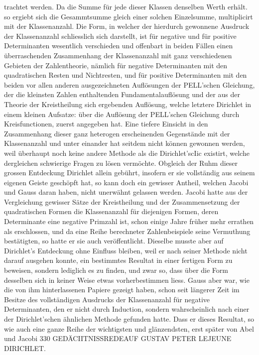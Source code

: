 \documentclass[11pt]{article}
\begin{document}
\noindent trachtet werden. Da die Summe für jede dieser Klassen denselben Werth erhält. so ergiebt sich die Gesammtsumme gleich einer solchen Einzelsumme, multiplicirt mit der Klassenanzahl. Die Form, in welcher der hierdurch gewonnene Ausdruck der Klassenanzahl schliesslich sich darstellt, ist für negative und für positive Determinanten wesentlich verschieden und offenbart in beiden Fällen einen überraschenden Zusammenhang der Klassenanzahl mit ganz verschiedenen Gebieten der Zahlentheorie, nämlich für negative Determinanten mit den quadratischen Resten und Nichtresten, und für positive Determinanten mit den beiden vor allen anderen ausgezeichneten Auflösungen der PELL’schen Gleichung, der die kleinsten Zahlen enthaltenden Fundamentalauflösung und der aus der Theorie der Kreistheilung sich ergebenden Auflösung, welche letztere Dirichlet in einem kleinen Aufsatze: über die Auflösung der PELL’schen Gleichung durch Kreisfunctionen, zuerst angegeben hat. Eine tiefere Einsicht in den Zusammenhang dieser ganz heterogen erscheinenden Gegenstände mit der Klassenanzahl und unter einander hat seitdem nicht können gewonnen werden, weil überhaupt noch keine andere Methode als die Dirichlet’scIic existirt, welche dergleichen schwierige Fragen zu lösen vermöchte. Obgleich der Ruhm dieser grossen Entdeckung Dirichlet allein gebührt, insofern er sie vollständig aus seinem eigenen Geiste geschöpft hat, so kann doch ein gewisser Antheil, welchen Jacobi und Gauss daran haben, nicht unerwähnt gelassen werden. Jacobi hatte aus der Vergleichung gewisser Sätze der Kreistheilung und der Zusammensetzung der quadratischen Formen die Klassenanzahl für diejenigen Formen, deren Determinante eine negative Primzahl ist, schon einige Jahre früher mehr errathen als erschlossen, und da eine Reihe berechneter Zahlenbeispiele seine Vermuthung bestätigten, so hatte er sie auch veröffentlicht. Dieselbe musste aber auf Dirichlet’s Entdeckung ohne Einfluss bleiben, weil er nach seiner Methode nicht darauf ausgehen konnte, ein bestimmtes Resultat in einer fertigen Form zu beweisen, sondern lediglich es zu finden, und zwar so, dass über die Form desselben sich in keiner Weise etwas vorherbestimmen liess. Gauss aber war, wie die von ihm hinterlassenen Papiere gezeigt haben, schon seit längerer Zeit im Besitze des vollständigen Ausdrucks der Klassenanzahl für negative Determinanten, den er nicht durch Induction, sondern wahrscheinlich nach einer der Dirichlet’schen ähnlichen Methode gefunden hatte. Dass er dieses Resultat, so wie auch eine ganze Reihe der wichtigsten und glänzendsten, erst später von Abel und Jacobi 330 GEDÄCIITNISSREDEAUF GUSTAV PETER LEJEUNE DIRICHLET.
\par
\end{document}
